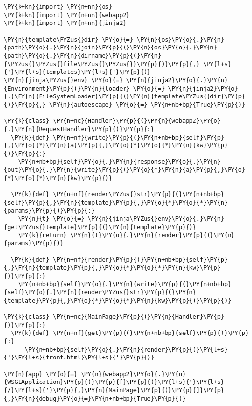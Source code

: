 \begin{Verbatim}[commandchars=\\\{\}]
\PY{k+kn}{import} \PY{n+nn}{os}
\PY{k+kn}{import} \PY{n+nn}{webapp2}
\PY{k+kn}{import} \PY{n+nn}{jinja2}

\PY{n}{template\PYZus{}dir} \PY{o}{=} \PY{n}{os}\PY{o}{.}\PY{n}{path}\PY{o}{.}\PY{n}{join}\PY{p}{(}\PY{n}{os}\PY{o}{.}\PY{n}{path}\PY{o}{.}\PY{n}{dirname}\PY{p}{(}\PY{n}{\PYZus{}\PYZus{}file\PYZus{}\PYZus{}}\PY{p}{)}\PY{p}{,} \PY{l+s}{'}\PY{l+s}{templates}\PY{l+s}{'}\PY{p}{)}
\PY{n}{jinja\PYZus{}env} \PY{o}{=} \PY{n}{jinja2}\PY{o}{.}\PY{n}{Environment}\PY{p}{(}\PY{n}{loader} \PY{o}{=} \PY{n}{jinja2}\PY{o}{.}\PY{n}{FileSystemLoader}\PY{p}{(}\PY{n}{template\PYZus{}dir}\PY{p}{)}\PY{p}{,} \PY{n}{autoescape} \PY{o}{=} \PY{n+nb+bp}{True}\PY{p}{)}

\PY{k}{class} \PY{n+nc}{Handler}\PY{p}{(}\PY{n}{webapp2}\PY{o}{.}\PY{n}{RequestHandler}\PY{p}{)}\PY{p}{:}
  \PY{k}{def} \PY{n+nf}{write}\PY{p}{(}\PY{n+nb+bp}{self}\PY{p}{,}\PY{o}{*}\PY{n}{a}\PY{p}{,}\PY{o}{*}\PY{o}{*}\PY{n}{kw}\PY{p}{)}\PY{p}{:}
    \PY{n+nb+bp}{self}\PY{o}{.}\PY{n}{response}\PY{o}{.}\PY{n}{out}\PY{o}{.}\PY{n}{write}\PY{p}{(}\PY{o}{*}\PY{n}{a}\PY{p}{,}\PY{o}{*}\PY{o}{*}\PY{n}{kw}\PY{p}{)}

  \PY{k}{def} \PY{n+nf}{render\PYZus{}str}\PY{p}{(}\PY{n+nb+bp}{self}\PY{p}{,}\PY{n}{template}\PY{p}{,}\PY{o}{*}\PY{o}{*}\PY{n}{params}\PY{p}{)}\PY{p}{:}
    \PY{n}{t} \PY{o}{=} \PY{n}{jinja\PYZus{}env}\PY{o}{.}\PY{n}{get\PYZus{}template}\PY{p}{(}\PY{n}{template}\PY{p}{)}
    \PY{k}{return} \PY{n}{t}\PY{o}{.}\PY{n}{render}\PY{p}{(}\PY{n}{params}\PY{p}{)}

  \PY{k}{def} \PY{n+nf}{render}\PY{p}{(}\PY{n+nb+bp}{self}\PY{p}{,}\PY{n}{template}\PY{p}{,}\PY{o}{*}\PY{o}{*}\PY{n}{kw}\PY{p}{)}\PY{p}{:}
    \PY{n+nb+bp}{self}\PY{o}{.}\PY{n}{write}\PY{p}{(}\PY{n+nb+bp}{self}\PY{o}{.}\PY{n}{render\PYZus{}str}\PY{p}{(}\PY{n}{template}\PY{p}{,}\PY{o}{*}\PY{o}{*}\PY{n}{kw}\PY{p}{)}\PY{p}{)}

\PY{k}{class} \PY{n+nc}{MainPage}\PY{p}{(}\PY{n}{Handler}\PY{p}{)}\PY{p}{:}
  \PY{k}{def} \PY{n+nf}{get}\PY{p}{(}\PY{n+nb+bp}{self}\PY{p}{)}\PY{p}{:}
      \PY{n+nb+bp}{self}\PY{o}{.}\PY{n}{render}\PY{p}{(}\PY{l+s}{'}\PY{l+s}{front.html}\PY{l+s}{'}\PY{p}{)}

\PY{n}{app} \PY{o}{=} \PY{n}{webapp2}\PY{o}{.}\PY{n}{WSGIApplication}\PY{p}{(}\PY{p}{[}\PY{p}{(}\PY{l+s}{'}\PY{l+s}{/}\PY{l+s}{'}\PY{p}{,}\PY{n}{MainPage}\PY{p}{)}\PY{p}{]}\PY{p}{,}\PY{n}{debug}\PY{o}{=}\PY{n+nb+bp}{True}\PY{p}{)}
\end{Verbatim}

